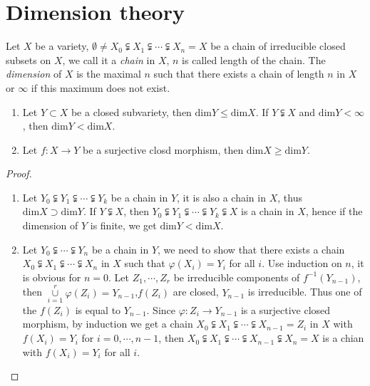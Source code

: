 \section{Dimension theory}


\begin{definition}
	Let $ X $ be a variety, $ \emptyset\neq X_0\subsetneqq X_1\subsetneqq\cdots\subsetneqq X_n=X $ be a chain of irreducible closed subsets on $ X $, we call it a \textit{chain} in $ X $, $ n $ is called length of the chain. The \textit{dimension} of $ X $ is the maximal $ n $ such that there exists a chain of length $ n $ in $ X $ or $ \infty $ if this maximum does not exist.
\end{definition}
\begin{lemma}{}
  \noindent
	\begin{enumerate}
		\item Let $ Y\subset X $ be a closed subvariety, then $ \mathrm{dim}Y\leq \mathrm{dim}X $. If $ Y\subsetneqq X $ and $ \mathrm{dim}Y <\infty$, then $ \mathrm{dim} Y<\mathrm{dim}X $.
		\item Let $ f:X\to Y $ be a surjective closd morphism, then $ \mathrm{dim}X\geq \mathrm{dim}Y $.
	\end{enumerate}
\end{lemma}
\begin{proof}
	\begin{enumerate}
		\item Let $ Y_0\subsetneqq Y_1\subsetneqq\cdots\subsetneqq Y_k $ be a chain in $ Y $, it is also a chain in $ X $, thus $ \mathrm{dim}X\supset \mathrm{dim}Y $. If $ Y\subsetneqq X $, then $ Y_0\subsetneqq Y_1\subsetneqq \cdots\subsetneqq Y_k\subsetneqq X $ is a chain in $ X $, hence if the dimension of  $ Y $ is finite, we get $ \mathrm{dim}Y<\mathrm{dim}X $.
		\item Let $ Y_0\subsetneqq \cdots\subsetneqq Y_n $ be a chain in $ Y $, we need to show that there exists a chain $ X_0\subsetneqq X_1\subsetneqq \cdots\subsetneqq X_n $ in $ X $ such that $ \varphi(X_i)=Y_i $ for all $ i $. Use induction on $ n $, it is obvious for $ n=0 $. Let $ Z_1,\cdots,Z_r $ be irreducible components of $ f^{-1}(Y_{n-1}) $, then $ \mathop{\cup}\limits_{i=1}^{r}\varphi(Z_i)=Y_{n-1} $,$ f(Z_i) $ are closed, $ Y_{n-1} $ is irreducible. Thus one of the $ f(Z_i) $ is equal to $ Y_{n-1} $.  Since $ \varphi :Z_i\to Y_{n-1} $ is a surjective closed morphism, by induction we get a chain $ X_0\subsetneqq X_1\subsetneqq \cdots\subsetneqq X_{n-1}=Z_i $ in $ X $ with $ f(X_i)=Y_i $ for $ i=0,\cdots,n-1 $, then $ X_0\subsetneqq X_1\subsetneqq \cdots\subsetneqq X_{n-1}\subsetneqq X_n=X $ is a chian with $ f(X_i)=Y_i $ for all $ i $.
	\end{enumerate}
\end{proof}
